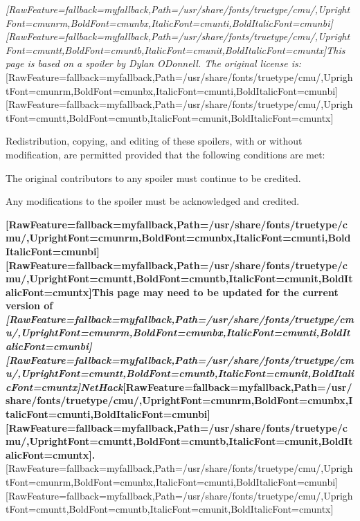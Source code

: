 {\itshape \allowbreak{}\setmainfont{cmunti.ttf}[RawFeature={fallback=myfallback},Path=/usr/share/fonts/truetype/cmu/,UprightFont=cmunrm,BoldFont=cmunbx,ItalicFont=cmunti,BoldItalicFont=cmunbi]\setmonofont{cmunti.ttf}[RawFeature={fallback=myfallback},Path=/usr/share/fonts/truetype/cmu/,UprightFont=cmuntt,BoldFont=cmuntb,ItalicFont=cmunit,BoldItalicFont=cmuntx]\itshape This page is based on a spoiler by Dylan O\textquotesingle{}Donnell\footnotemark[148]. The original license is:}\allowbreak{}\setmainfont{cmunrm.ttf}[RawFeature={fallback=myfallback},Path=/usr/share/fonts/truetype/cmu/,UprightFont=cmunrm,BoldFont=cmunbx,ItalicFont=cmunti,BoldItalicFont=cmunbi]\setmonofont{cmunrm.ttf}[RawFeature={fallback=myfallback},Path=/usr/share/fonts/truetype/cmu/,UprightFont=cmuntt,BoldFont=cmuntb,ItalicFont=cmunit,BoldItalicFont=cmuntx]


Redistribution, copying, and editing of these spoilers, with or without modification, are permitted provided that the following conditions are met:




\begin{myenumerate}\item{}The original contributors to any spoiler must continue to be credited.
\item{}Any modifications to the spoiler must be acknowledged and credited.
\end{myenumerate}




{\bfseries \allowbreak{}\setmainfont{cmunbx.ttf}[RawFeature={fallback=myfallback},Path=/usr/share/fonts/truetype/cmu/,UprightFont=cmunrm,BoldFont=cmunbx,ItalicFont=cmunti,BoldItalicFont=cmunbi]\setmonofont{cmunbx.ttf}[RawFeature={fallback=myfallback},Path=/usr/share/fonts/truetype/cmu/,UprightFont=cmuntt,BoldFont=cmuntb,ItalicFont=cmunit,BoldItalicFont=cmuntx]\bfseries This page may need to be updated for the current version\footnotemark[149] of {\itshape \allowbreak{}\setmainfont{cmunbi.ttf}[RawFeature={fallback=myfallback},Path=/usr/share/fonts/truetype/cmu/,UprightFont=cmunrm,BoldFont=cmunbx,ItalicFont=cmunti,BoldItalicFont=cmunbi]\setmonofont{cmunbi.ttf}[RawFeature={fallback=myfallback},Path=/usr/share/fonts/truetype/cmu/,UprightFont=cmuntt,BoldFont=cmuntb,ItalicFont=cmunit,BoldItalicFont=cmuntx]\bfseries \itshape NetHack}\allowbreak{}\setmainfont{cmunbx.ttf}[RawFeature={fallback=myfallback},Path=/usr/share/fonts/truetype/cmu/,UprightFont=cmunrm,BoldFont=cmunbx,ItalicFont=cmunti,BoldItalicFont=cmunbi]\setmonofont{cmunbx.ttf}[RawFeature={fallback=myfallback},Path=/usr/share/fonts/truetype/cmu/,UprightFont=cmuntt,BoldFont=cmuntb,ItalicFont=cmunit,BoldItalicFont=cmuntx]\bfseries .}\allowbreak{}\setmainfont{cmunrm.ttf}[RawFeature={fallback=myfallback},Path=/usr/share/fonts/truetype/cmu/,UprightFont=cmunrm,BoldFont=cmunbx,ItalicFont=cmunti,BoldItalicFont=cmunbi]\setmonofont{cmunrm.ttf}[RawFeature={fallback=myfallback},Path=/usr/share/fonts/truetype/cmu/,UprightFont=cmuntt,BoldFont=cmuntb,ItalicFont=cmunit,BoldItalicFont=cmuntx]


